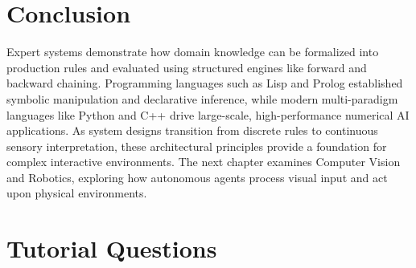 \documentclass[12pt]{report}
\begin{document}
\section{Conclusion}

Expert systems demonstrate how domain knowledge can be formalized into production rules and evaluated using structured engines like forward and backward chaining. Programming languages such as Lisp and Prolog established symbolic manipulation and declarative inference, while modern multi-paradigm languages like Python and C++ drive large-scale, high-performance numerical AI applications. As system designs transition from discrete rules to continuous sensory interpretation, these architectural principles provide a foundation for complex interactive environments. The next chapter examines Computer Vision and Robotics, exploring how autonomous agents process visual input and act upon physical environments.

\section*{Tutorial Questions}
\end{document}
